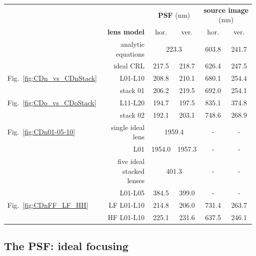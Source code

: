 \begin{refsection}
\begin{table}[h]
\centering
\begin{tabular}{lrcccc}\hline \hline
&                        &\multicolumn{2}{c}{\textbf{PSF} (nm)}   &\multicolumn{2}{c}{\textbf{source image} (nm)}\\
&\textbf{lens model}     &hor.           &ver.                    &hor.            &ver. \\ \cline{2-6}
&analytic equations       &\multicolumn{2}{c}{223.3}           &603.8           &241.7 \\
&ideal CRL               &217.5          &218.7                   &626.4           &247.5 \\ \hline
Fig.~\ref{fig:CDn_vs_CDnStack} &L01-L10  &208.8  &210.1           &680.1           &254.4 \\
&stack 01                &206.2          &219.5                   &692.0           &254.1\\ \hline
Fig.~\ref{fig:CDo_vs_CDoStack} &L11-L20  &194.7  &197.5           &835.1           &374.8 \\
&stack 02                &192.1          &203.1                   &748.6           &268.9 \\ \hline
Fig.~\ref{fig:CDn01-05-10}&single ideal lens  &\multicolumn{2}{c}{1959.4}   & -    & -\\
&L01                     &1954.0         &1957.3                  & -              & - \\
&five ideal stacked lenses  &\multicolumn{2}{c}{401.3}            & -              & - \\
&L01-L05                 &384.5       &399.0                      & -              & - \\ \hline
Fig.~\ref{fig:CDnFF_LF_HH} &LF L01-L10  &214.8     &206.0         & 731.4          &263.7 \\
&HF L01-L10              &225.1      &231.6                       & 637.5          &246.1 \\
\hline \hline
\end{tabular}
\end{table}{}

\subsection{The PSF: ideal focusing}\label{sec:psf_sim}


\end{refsection}
